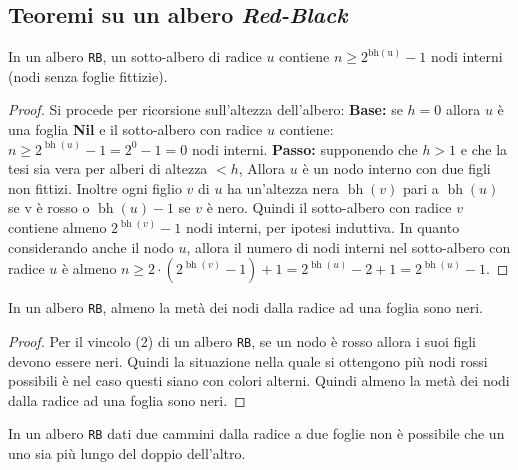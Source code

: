     \subsection{Teoremi su un albero \textit{Red-Black}}
        \begin{theorem}
            In un albero \texttt{RB}, un sotto-albero di radice $ u $ contiene $ n \geq 2^{\operatorname{bh(u)}} - 1 $ nodi interni (nodi senza foglie fittizie).
        \end{theorem}
        \begin{proof}
            Si procede per ricorsione sull'altezza dell'albero:\newline
            \textbf{Base:} se $ h=0$ allora $ u $ è una foglia \textbf{Nil} e il sotto-albero con radice $ u $ contiene: $n\geq 2^{\operatorname{bh}(u)} - 1 = 2^0 - 1 = 0$ nodi interni.\checkmark\newline
            \textbf{Passo:} supponendo che $ h > 1 $ e che la tesi sia vera per alberi di altezza $ < h $, Allora $ u $ è un nodo interno con due figli non fittizi. Inoltre ogni figlio $ v $ di $ u $ ha un'altezza nera $ \operatorname{bh}(v) $ pari a $ \operatorname{bh}(u) $ se v è rosso o $ \operatorname{bh}(u) - 1 $ se $ v $ è nero. Quindi il sotto-albero con radice $ v $ contiene almeno $ 2^{\operatorname{bh}(v)} - 1 $ nodi interni, per ipotesi induttiva. In quanto considerando anche il nodo $ u $, allora il numero di nodi interni nel sotto-albero con radice $ u $ è almeno $ n\geq 2\cdot \left(2^{\operatorname{bh}(v)} - 1\right) + 1 = 2^{\operatorname{bh}(u)} - 2 + 1 = 2^{\operatorname{bh}(u)} - 1 $.\checkmark
        \end{proof}
        \begin{theorem}
            In un albero \texttt{RB}, almeno la metà dei nodi dalla radice ad una foglia sono neri.
        \end{theorem}
        \begin{proof}
            Per il vincolo (2) di un albero \texttt{RB}, se un nodo è rosso allora i suoi figli devono essere neri. Quindi la situazione nella quale si ottengono più nodi rossi possibili è nel caso questi siano con colori alterni.\newline
            Quindi almeno la metà dei nodi dalla radice ad una foglia sono neri.
        \end{proof}
        \begin{theorem}
            In un albero \texttt{RB} dati due cammini dalla radice a due foglie non è possibile che un uno sia più lungo del doppio dell'altro.
        \end{theorem}

